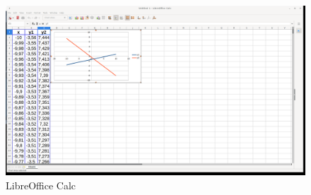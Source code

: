 \begin{figure}[h!]		
	\centering
   	\includegraphics[width=8.0in]{pictures/picture_016.png}
  	\caption{LibreOffice Calc}
   	\label{fig:LibreOfficeCalc016}
\end{figure}